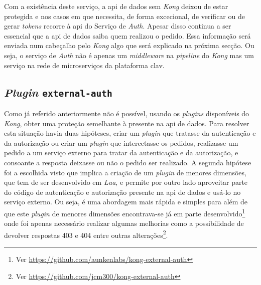Com a existência deste serviço, a \acrshort{api} de dados sem \textit{Kong} deixou de estar protegida e nos casos em que necessita, de forma excecional, de verificar ou de gerar \textit{tokens} recorre à \acrshort{api} do Serviço de \textit{Auth}. Apesar disso continua a ser essencial que a \acrshort{api} de dados saiba quem realizou o pedido. Essa informação será enviada num cabeçalho pelo \textit{Kong} algo que será explicado na próxima secção. Ou seja, o serviço de \textit{Auth} não é apenas um \textit{middleware} na \textit{pipeline} do \textit{Kong} mas um serviço na rede de microserviços da plataforma \acrshort{clav}.

\subsection{\textit{Plugin} \texttt{external-auth}}
Como já referido anteriormente não é possível, usando os \textit{plugins} disponíveis do \textit{Kong}, obter uma proteção semelhante à presente na \acrshort{api} de dados. Para resolver esta situação havia duas hipóteses, criar um \textit{plugin} que tratasse da autenticação e da autorização ou criar um \textit{plugin} que intercetasse os pedidos, realizasse um pedido a um serviço externo para tratar da autenticação e da autorização, e consoante a resposta deixasse ou não o pedido ser realizado. A segunda hipótese foi a escolhida visto que implica a criação de um \textit{plugin} de menores dimensões, que tem de ser desenvolvido em \textit{Lua}, e permite por outro lado aproveitar parte do código de autenticação e autorização presente na \acrshort{api} de dados e usá-lo no serviço externo. Ou seja, é uma abordagem mais rápida e simples para além de que este \textit{plugin} de menores dimensões encontrava-se já em parte desenvolvido\footnote{Ver \url{https://github.com/aunkenlabs/kong-external-auth}} onde foi apenas necessário realizar algumas melhorias como a possibilidade de devolver respostas 403 e 404 entre outras alterações\footnote{Ver \url{https://github.com/jcm300/kong-external-auth}}.

